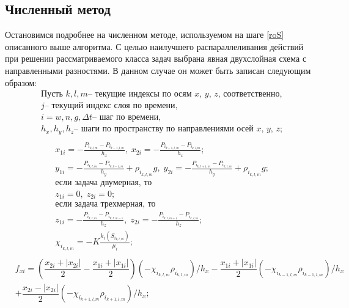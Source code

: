 \subsection{Численный метод}
Остановимся подробнее на численном методе, используемом на шаге \ref{roS}
описанного выше алгоритма. С целью наилучшего распараллеливания действий при
решении рассматриваемого класса задач выбрана явная двухслойная схема с направленными разностями. 
В данном случае он может быть записан следующим
образом:
\begin{equation*}
  \begin{aligned}
    &\text{Пусть } k, l, m \text{-- текущие индексы по осям $x$, $y$, $z$, соответственно,}\\
    &j \text{-- текущий индекс слоя по времени,}\\
    &i=w,n,g, \Delta t \text{-- шаг по времени,}\\
    &h_x, h_y, h_z \text{-- шаги по пространству по 
    направлениями осей $x$, $y$, $z$};\\
  \end{aligned}
\end{equation*}
\begin{equation*}
  \begin{aligned}
    &x_{1i}= - \frac{P_{i_{k,l,m}}-P_{i_{k-1,l,m}}}{h_x} , \;
    x_{2i}= - \frac{P_{i_{k+1,l,m}}-P_{i_{k,l,m}}}{h_x} ;\\
    &y_{1i}= - \frac{P_{i_{k,l,m}}-P_{i_{k,l-1,m}}}{h_y} + \rho_{i_{k,l,m}} g,\;
    y_{2i}= - \frac{P_{i_{k,l+1,m}}-P_{i_{k,l,m}}}{h_y} + \rho_{i_{k,l,m}} g;\\
    &\text{если задача двумерная, то} \\
    &z_{1i}= 0 ,\;
    z_{2i}= 0 ;\\
    &\text{если задача трехмерная, то} \\
    &z_{1i}= - \frac{P_{i_{k,l,m}}-P_{i_{k,l,m-1}}}{h_z} ,\;
    z_{2i}= - \frac{P_{i_{k,l,m+1}}-P_{i_{k,l,m}}}{h_z} ;\\
    &\chi_{i_{k,l,m}}=-K\frac{k_i(S_{i_{k,l,m}})}{\mu_i} ;\\
  \end{aligned}
\end{equation*}
\begin{eqnarray*}
    &f_{xi}= \left( \dfrac{x_{2i}+|x_{2i}|}{2} - \dfrac{x_{1i}+|x_{1i}|}{2} \right)(-\chi_{i_{k,l,m}} \rho_{i_{k,l,m}}) / h_x
    - \dfrac{x_{1i}+|x_{1i}|}{2} (-\chi_{i_{k-1,l,m}} \rho_{i_{k-1,l,m}}) / h_x \\
    & +  \dfrac{x_{2i}-|x_{2i}|}{2} (-\chi_{i_{k+1,l,m}} \rho_{i_{k+1,l,m}}) / h_x;
\end{eqnarray*}
